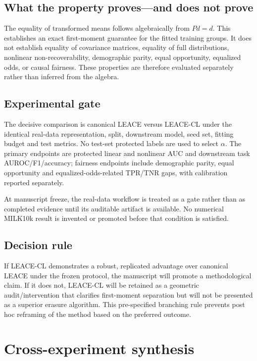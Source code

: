 \subsection{What the property proves---and does not prove}
The equality of transformed means follows algebraically from $Pd=d$. This establishes an exact first-moment guarantee for the fitted training groups. It does not establish equality of covariance matrices, equality of full distributions, nonlinear non-recoverability, demographic parity, equal opportunity, equalized odds, or causal fairness. These properties are therefore evaluated separately rather than inferred from the algebra.

\subsection{Experimental gate}
The decisive comparison is canonical LEACE versus LEACE-CL under the identical real-data representation, split, downstream model, seed set, fitting budget and test metrics. No test-set protected labels are used to select $\alpha$. The primary endpoints are protected linear and nonlinear AUC and downstream task AUROC/F1/accuracy; fairness endpoints include demographic parity, equal opportunity and equalized-odds-related TPR/TNR gaps, with calibration reported separately.

At manuscript freeze, the real-data workflow is treated as a gate rather than as completed evidence until its auditable artifact is available. No numerical MILK10k result is invented or promoted before that condition is satisfied.

\subsection{Decision rule}
If LEACE-CL demonstrates a robust, replicated advantage over canonical LEACE under the frozen protocol, the manuscript will promote a methodological claim. If it does not, LEACE-CL will be retained as a geometric audit/intervention that clarifies first-moment separation but will not be presented as a superior erasure algorithm. This pre-specified branching rule prevents post hoc reframing of the method based on the preferred outcome.

\section{Cross-experiment synthesis}
\label{sec:synthesis}

